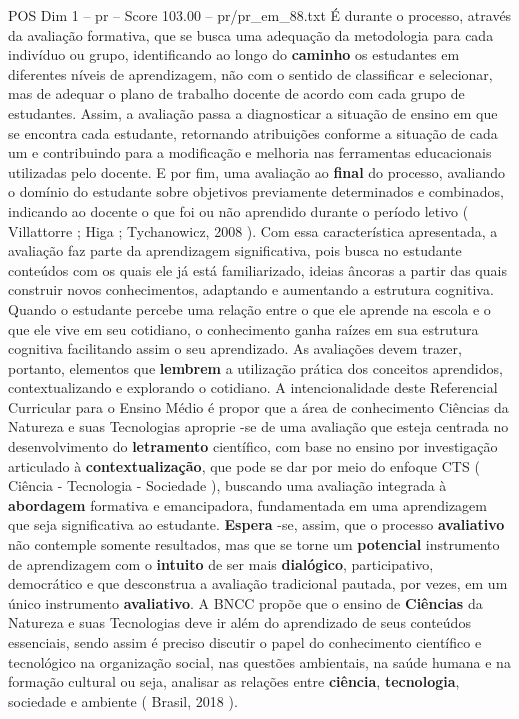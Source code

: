 \begin{textsample}{POS Dim 1 – pr – Score 103.00 – pr/pr\_em\_88.txt}
É durante o processo, através da avaliação formativa, que se busca uma adequação da metodologia para cada indivíduo ou grupo, identificando ao longo do \textbf{caminho} os estudantes em diferentes níveis de aprendizagem, não com o sentido de classificar e selecionar, mas de adequar o plano de trabalho docente de acordo com cada grupo de estudantes.
Assim, a avaliação passa a diagnosticar a situação de ensino em que se encontra cada estudante, retornando atribuições conforme a situação de cada um e contribuindo para a modificação e melhoria nas ferramentas educacionais utilizadas pelo docente.
E por fim, uma avaliação ao \textbf{final} do processo, avaliando o domínio do estudante sobre objetivos previamente determinados e combinados, indicando ao docente o que foi ou não aprendido durante o período letivo ( Villattorre ; Higa ; Tychanowicz, 2008 ).
Com essa característica apresentada, a avaliação faz parte da aprendizagem significativa, pois busca no estudante conteúdos com os quais ele já está familiarizado, ideias âncoras a partir das quais construir novos conhecimentos, adaptando e aumentando a estrutura cognitiva.
Quando o estudante percebe uma relação entre o que ele aprende na escola e o que ele vive em seu cotidiano, o conhecimento ganha raízes em sua estrutura cognitiva facilitando assim o seu aprendizado.
As avaliações devem trazer, portanto, elementos que \textbf{lembrem} a utilização prática dos conceitos aprendidos, contextualizando e explorando o cotidiano.
A intencionalidade deste Referencial Curricular para o Ensino Médio é propor que a área de conhecimento Ciências da Natureza e suas Tecnologias aproprie -se de uma avaliação que esteja centrada no desenvolvimento do \textbf{letramento} científico, com base no ensino por investigação articulado à \textbf{contextualização}, que pode se dar por meio do enfoque CTS ( Ciência - Tecnologia - Sociedade ), buscando uma avaliação integrada à \textbf{abordagem} formativa e emancipadora, fundamentada em uma aprendizagem que seja significativa ao estudante. \textbf{Espera} -se, assim, que o processo \textbf{avaliativo} não contemple somente resultados, mas que se torne um \textbf{potencial} instrumento de aprendizagem com o \textbf{intuito} de ser mais \textbf{dialógico}, participativo, democrático e que desconstrua a avaliação tradicional pautada, por vezes, em um único instrumento \textbf{avaliativo}.
A BNCC propõe que o ensino de \textbf{Ciências} da Natureza e suas Tecnologias deve ir além do aprendizado de seus conteúdos essenciais, sendo assim é preciso discutir o papel do conhecimento científico e tecnológico na organização social, nas questões ambientais, na saúde humana e na formação cultural ou seja, analisar as relações entre \textbf{ciência}, \textbf{tecnologia}, sociedade e ambiente ( Brasil, 2018 ).

\end{textsample}
